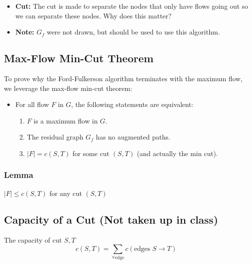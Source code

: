 \begin{example}
    \begin{itemize}
        \item \textbf{Cut:} The cut is made to separate the nodes that only have flows going out so we can separate these nodes. Why does this matter?
        \item \textbf{Note:} $G_f$ were not drawn, but should be used to use this algorithm.
    \end{itemize}
\end{example}

\subsection{Max-Flow Min-Cut Theorem}
\begin{theorem}
    To prove why the Ford-Fulkerson algorithm terminates with the maximum flow, we leverage the max-flow min-cut theorem:
    \begin{itemize}
        \item For all flow $F$ in $G$, the following statements are equivalent:
        \begin{enumerate}
            \item $F$ is a maximum flow in $G$.
            \item The residual graph $G_f$ has no augmented paths.
            \item $|F| = c(S, T)$ for some cut $(S, T)$ (and actually the min cut).
        \end{enumerate}
    \end{itemize}
\end{theorem}

\subsubsection{Lemma}
\begin{theorem}
    $|F| \leq c(S, T)$ for any cut $(S, T)$
\end{theorem}

\subsection{Capacity of a Cut (Not taken up in class)}
\begin{definition} The capacity of cut $S,T$
    \[
    c(S, T) = \sum_{\forall \text{edge}} c(\text{edges } S \rightarrow T)
    \]
\end{definition}

